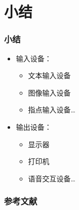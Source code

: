 \documentclass{beamer}
\begin{document}
\section{小结}
\begin{frame}
	\frametitle{小结}
	\begin{itemize}
		\item 输入设备：
		\begin{itemize}
			\item 文本输入设备
			\item 图像输入设备
			\item 指点输入设备\dots
		\end{itemize}
		\item 输出设备：
		\begin{itemize}
			\item 显示器 
			\item 打印机
			\item 语音交互设备\dots
		\end{itemize}
	\end{itemize}
\end{frame}

\begin{frame}
	\frametitle{参考文献}
	
	
\end{frame}
\end{document}
